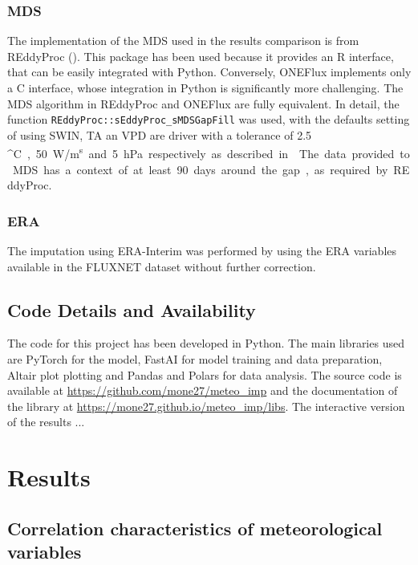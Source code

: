 \documentclass{article}
\let\Oldsection\section
\renewcommand{\section}{\FloatBarrier\Oldsection}
\let\Oldsubsection\subsection
\renewcommand{\subsection}{\FloatBarrier\Oldsubsection}
\begin{document}
\subsubsection{MDS}

The implementation of the MDS used in the results comparison is from REddyProc (\cite{wutzler_basic_2018}). This package has been used because it provides an R interface, that can be easily integrated with Python. Conversely, ONEFlux implements only a C interface, whose integration in Python is significantly more challenging.  The MDS algorithm in REddyProc and ONEFlux are fully equivalent. In detail, the function \verb|REddyProc::sEddyProc_sMDSGapFill| was used, with the defaults setting of using SW\textunderscore IN, TA an VPD are driver with a tolerance of 2.5 \si{^\circ C}, 50 \si{W/m^s} and 5 \si{hPa} respectively as described in \cite{reichstein_separation_2005-3}.
The data provided to MDS has a context of at least 90 days around the gap, as required by REddyProc. 

\subsubsection{ERA} The imputation using ERA-Interim was performed by using the ERA variables available in the FLUXNET dataset without further correction.

\subsection{Code Details and Availability}

The code for this project has been developed in Python. The main libraries used are PyTorch for the model,  FastAI for model training and data preparation, Altair plot plotting and Pandas and Polars for data analysis. The source code is available at \url{https://github.com/mone27/meteo_imp} and the documentation of the library at \url{https://mone27.github.io/meteo_imp/libs}. %
The interactive version of the results ...
\pagebreak

\section{Results}

\subsection{Correlation characteristics of meteorological variables}
\end{document}
